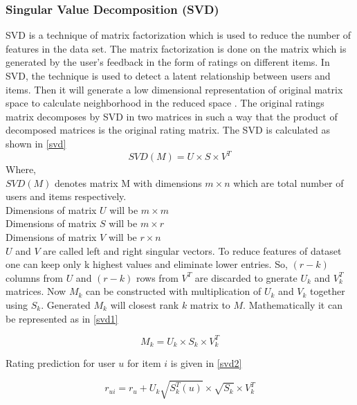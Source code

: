 \subsubsection{Singular Value Decomposition (SVD)}
\label{sec:svd}
SVD is a technique of matrix factorization which is used to reduce the number of features in the data set. The matrix factorization is done on the matrix which is generated by the user's feedback in the form of ratings on different items. In SVD, the technique is used to detect a latent relationship between users and items. Then it will generate a low dimensional representation of original matrix space to calculate neighborhood in the reduced space \cite{32}. The original ratings matrix decomposes by SVD in two matrices in such a way that the product of decomposed matrices is the original rating matrix. The SVD is calculated as shown in \autoref{svd}
\begin{equation}
SVD(M) = U \times S \times V^{T} 
\label{svd}
\end{equation}
\noindent Where,\\
$SVD(M)$ denotes matrix M with dimensions $m \times n$ which are total number of users and items respectively.\\
Dimensions of matrix $U$ will be $m \times m$ \\
Dimensions of matrix $S$ will be $m \times r$ \\
Dimensions of matrix $V$ will be $r \times n$ \\
$U$ and $V$ are called left and right singular vectors. To reduce features of dataset one can keep only k highest values and eliminate lower entries. So, $(r-k)$ columns from $U$ and $(r-k)$ rows from $V^{T}$ are discarded to gnerate $U_{k}$ and $V_{k}^{T}$ matrices. Now $M_{k}$ can be constructed with multiplication of $U_{k}$ and $V_{k}$ together using $S_{k}$. Generated $M_{k}$ will closest rank $k$ matrix to $M$. Mathematically it can be represented as in \autoref{svd1}

\begin{equation}
M_{k} = U_{k} \times S_{k} \times V_{k}^{T} 
\label{svd1}
\end{equation}

\noindent Rating prediction for user $u$ for item $i$ is given in \autoref{svd2} 

\begin{equation}
r_{ui} = r_{u} + U_{k} \sqrt{S_{k}^{T} (u)} \times \sqrt{S_k} \times V_{k}^{T}
\label{svd2}
\end{equation}

